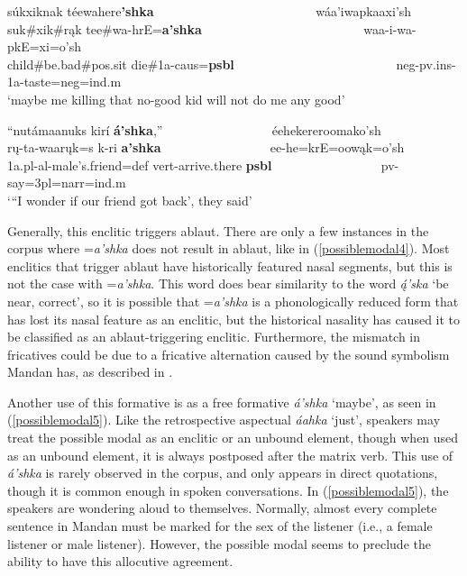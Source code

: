 \begin{exe}
\begin{xlist}
	\item\label{possiblemodal4}
	\glll súkxiknak téewahere\textbf{'shka} ~ ~ ~ ~ ~ ~ ~ ~ ~ ~ ~ ~ ~ ~ ~  wáa'iwapkaaxi'sh\\
	suk\#xik\#rąk tee\#wa-hrE=\textbf{a'shka} ~ ~ ~ ~ ~ ~ ~ ~ ~ ~ ~ ~ ~ ~ ~  waa-i-wa-pkE=xi=o'sh\\
	\textnormal{child}\#\textnormal{be.bad}\#pos.sit \textnormal{die}\#1a-caus=\textbf{psbl} ~ ~ ~ ~ ~ ~ ~ ~ ~ ~ ~ ~ ~ ~ ~  neg-pv.ins-1a-\textnormal{taste}=neg=ind.m\\
	\glt `maybe me killing that no-good kid will not do me any good' \citep[132]{hollow1973b}

	\item\label{possiblemodal5}
	\glll ``nutámaanuks kirí \textbf{á'shka},'' ~ ~ ~ ~ ~ ~ ~ ~ ~ ~ éehekereroomako'sh\\
	rų-ta-waarųk=s k-ri \textbf{a'shka} ~ ~ ~ ~ ~ ~ ~ ~ ~ ~  ee-he=krE=oowąk=o'sh\\
	1a.pl-al-\textnormal{male's.friend}=def vert-\textnormal{arrive.there} \textbf{psbl} ~ ~ ~ ~ ~ ~ ~ ~ ~ ~ pv-\textnormal{say}=3pl=narr=ind.m\\
	\glt `{``}I wonder if our friend got back', they said' \citep[214]{hollow1973b}

	\end{xlist}

\end{exe}

Generally, this enclitic triggers ablaut. There are only a few instances in the corpus where =\textit{a'shka} does not result in ablaut, like in (\ref{possiblemodal4}). Most enclitics that trigger ablaut have historically featured nasal segments, but this is not the case with =\textit{a'shka}. This word does bear similarity to the word \textit{ą́'ska} `be near, correct', so it is possible that =\textit{a'shka} is a phonologically reduced form that has lost its nasal feature as an enclitic, but the historical nasality has caused it to be classified as an ablaut-triggering enclitic. Furthermore, the mismatch in fricatives could be due to a fricative alternation caused by the sound symbolism Mandan has, as described in .

Another use of this formative is as a free formative \textit{á'shka} `maybe', as seen in (\ref{possiblemodal5}). Like the retrospective aspectual \textit{áahka} `just', speakers may treat the possible modal as an enclitic or an unbound element, though when used as an unbound element, it is always postposed after the matrix verb. This use of \textit{á'shka} is rarely observed in the corpus, and only appears in direct quotations, though it is common enough in spoken conversations. In (\ref{possiblemodal5}), the speakers are wondering aloud to themselves. Normally, almost every complete sentence in Mandan must be marked for the sex of the listener (i.e., a female listener or male listener). However, the possible modal seems to preclude the ability to have this allocutive agreement.

